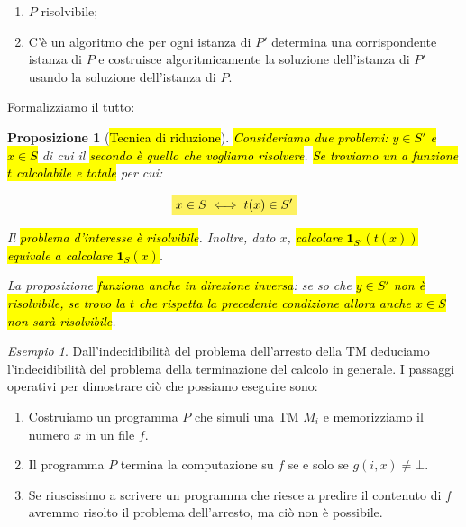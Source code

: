 \documentclass[a4paper,11pt,oneside]{article}
\theoremstyle{plain}
\newtheorem{prop}{Proposizione}[section]
\theoremstyle{definition}
\theoremstyle{remark}
\newtheorem{esempio}{Esempio}[section]
\newcommand{\mhl}[1]{\colorbox{hlcolor}{$\displaystyle #1$}}
\begin{document}
\begin{enumerate}
  \item $P$ risolvibile;
  \item C'è un algoritmo che per ogni istanza di $P'$ determina una
    corrispondente istanza di $P$ e costruisce algoritmicamente la soluzione
    dell'istanza di $P'$ usando la soluzione dell'istanza di $P$.
\end{enumerate}

Formalizziamo il tutto:

\begin{prop}[\hl{Tecnica di riduzione}]\label{thm:riduzione}
  \hl{Consideriamo due problemi: $y \in S'$ e $x \in S$} di cui il \hl{secondo è
  quello che vogliamo risolvere}. \hl{Se troviamo un a funzione $t$ calcolabile
  e totale} per cui:

  \begin{equation}
    \mhl{
      x \in S \iff t(x) \in S'
    }
  \end{equation}

  Il \hl{problema d'interesse è risolvibile}. Inoltre, dato $x$, \hl{calcolare
  $\mathbf{1}_{S'}(t(x))$ equivale a calcolare $\mathbf{1}_S(x)$}.

  La proposizione \hl{funziona anche in direzione inversa}: se so che \hl{$y \in
  S'$ non è risolvibile, se trovo la $t$ che rispetta la precedente condizione
  allora anche $x \in S$ non sarà risolvibile}.
\end{prop}

\begin{esempio}
  Dall'indecidibilità del problema dell'arresto della TM deduciamo
  l'indecidibilità del problema della terminazione del calcolo in generale. I
  passaggi operativi per dimostrare ciò che possiamo eseguire sono:

  \begin{enumerate}
    \item Costruiamo un programma $P$ che simuli una TM $M_i$ e memorizziamo il
      numero $x$ in un file $f$.
    \item Il programma $P$ termina la computazione su $f$ se e solo se $g(i,x)
      \neq \bot$.
    \item Se riuscissimo a scrivere un programma che riesce a predire il
      contenuto di $f$ avremmo risolto il problema dell'arresto, ma ciò non è
      possibile.
  \end{enumerate}
\end{esempio}
\end{document}
